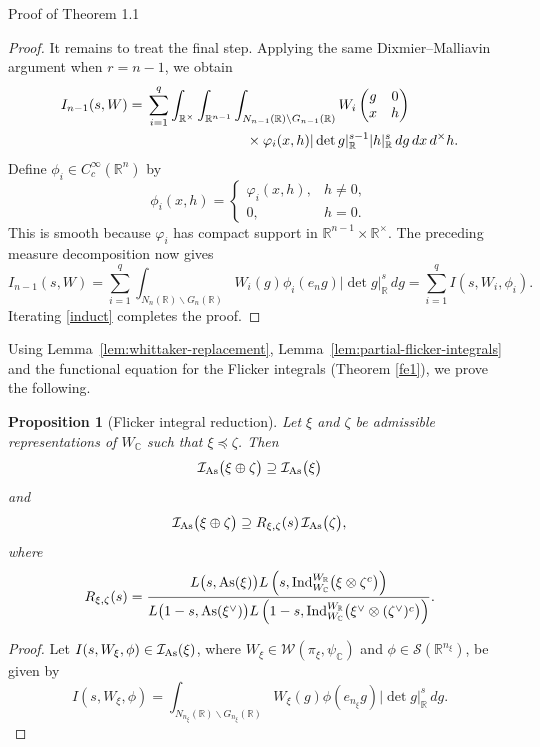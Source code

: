\documentclass[12pt,reqno]{amsart}
\numberwithin{equation}{section}%
\numberwithin{equation}{subsection}
\newtheorem{prop}[equation]{Proposition}
\theoremstyle{definition}
\theoremstyle{remark}
\begin{document}
\begin{section}{Proof of Theorem 1.1}
\begin{proof}
It remains to treat the final step. Applying the same
Dixmier--Malliavin argument when $r=n-1$, we obtain
\[
\begin{aligned}
I_{n-1}(s,W)
={}&
\sum_{i=1}^q
\int_{\mathbb R^\times}
\int_{\mathbb R^{n-1}}
\int_{N_{n-1}(\mathbb R)\backslash G_{n-1}(\mathbb R)}
W_i
\begin{pmatrix}
g&0\\
x&h
\end{pmatrix}                                      \\
&\hspace{25mm}\times
\varphi_i(x,h)
|\det g|_{\mathbb R}^{s-1}
|h|_{\mathbb R}^{s}
\,dg\,dx\,d^\times h.
\end{aligned}
\]
Define $\phi_i\in C_c^\infty(\mathbb R^n)$ by
\[
\phi_i(x,h)
=
\begin{cases}
\varphi_i(x,h),&h\neq0,\\
0,&h=0.
\end{cases}
\]
This is smooth because $\varphi_i$ has compact support in
$\mathbb R^{n-1}\times\mathbb R^\times$. The preceding measure
decomposition now gives
\[
I_{n-1}(s,W)
=
\sum_{i=1}^q
\int_{N_n(\mathbb R)\backslash G_n(\mathbb R)}
W_i(g)\phi_i(e_ng)|\det g|_{\mathbb R}^{s}\,dg
=
\sum_{i=1}^q I(s,W_i,\phi_i).
\]
Iterating \eqref{induct} completes the proof.
\end{proof}


Using Lemma~\ref{lem:whittaker-replacement},  Lemma~\ref{lem:partial-flicker-integrals} and the functional equation
for the Flicker integrals (Theorem \ref{fe1}), we prove the following.

\begin{prop}[Flicker integral reduction]
\label{prop:asai-integral-inclusions}
Let $\xi$ and $\zeta$ be admissible representations of
$W_{\mathbb{C}}$ such that $\xi\preceq\zeta$. Then
\[
\mathcal{I}_{\rm As}\bigl(\xi\oplus\zeta\bigr)
\supseteq
\mathcal{I}_{\rm As}\bigl(\xi\bigr)
\]
and
\[
\mathcal{I}_{\rm As}\bigl(\xi\oplus\zeta\bigr)
\supseteq
R_{\xi,\zeta}(s)\,
\mathcal{I}_{\rm As}\bigl(\zeta\bigr),
\]
where
\[
R_{\xi,\zeta}(s)
=
\frac{
L\bigl(s,{\rm As}(\xi)\bigr)
L\left(
s,
\operatorname{Ind}_{W_{\mathbb{C}}}^{W_{\mathbb{R}}}
\bigl(\xi\otimes\zeta^c\bigr)
\right)
}{
L\bigl(1-s,{\rm As}(\xi^\vee)\bigr)
L\left(
1-s,
\operatorname{Ind}_{W_{\mathbb{C}}}^{W_{\mathbb{R}}}
\bigl(\xi^\vee\otimes(\zeta^\vee)^c\bigr)
\right)
}.
\]
\end{prop}

\begin{proof}
Let \(I(s,W_\xi,\phi)\in\mathcal{I}_{\rm As}(\xi)\), where
\(W_\xi\in\mathcal{W}(\pi_\xi,\psi_{\mathbb C})\) and
\(\phi\in\mathcal{S}(\mathbb R^{n_\xi})\), be given by
\[
I(s,W_\xi,\phi)
=
\int_{N_{n_\xi}(\mathbb R)\backslash G_{n_\xi}(\mathbb R)}
W_\xi(g)\phi(e_{n_\xi}g)|\det g|_{\mathbb R}^s\,dg.
\]


\end{proof}
\end{section}
\end{document}
